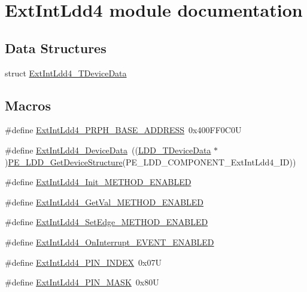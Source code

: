 \hypertarget{group___ext_int_ldd4__module}{\section{Ext\-Int\-Ldd4 module documentation}
\label{group___ext_int_ldd4__module}
}
\subsection*{Data Structures}
\begin{DoxyCompactItemize}
\item 
struct \hyperlink{struct_ext_int_ldd4___t_device_data}{Ext\-Int\-Ldd4\-\_\-\-T\-Device\-Data}
\end{DoxyCompactItemize}
\subsection*{Macros}
\begin{DoxyCompactItemize}
\item 
\#define \hyperlink{group___ext_int_ldd4__module_ga1693c80c3b1560249c672ecbb04484cc}{Ext\-Int\-Ldd4\-\_\-\-P\-R\-P\-H\-\_\-\-B\-A\-S\-E\-\_\-\-A\-D\-D\-R\-E\-S\-S}~0x400\-F\-F0\-C0\-U
\item 
\#define \hyperlink{group___ext_int_ldd4__module_ga8783b358df665e3568cd57ea48449719}{Ext\-Int\-Ldd4\-\_\-\-Device\-Data}~((\hyperlink{group___p_e___types__module_gac5cf1362f1f0e3a2ce71b1bf2276d091}{L\-D\-D\-\_\-\-T\-Device\-Data} $\ast$)\hyperlink{group___p_e___types__module_gaa1c23d559daef5bcd3327ca83fb56f5a}{P\-E\-\_\-\-L\-D\-D\-\_\-\-Get\-Device\-Structure}(P\-E\-\_\-\-L\-D\-D\-\_\-\-C\-O\-M\-P\-O\-N\-E\-N\-T\-\_\-\-Ext\-Int\-Ldd4\-\_\-\-I\-D))
\item 
\#define \hyperlink{group___ext_int_ldd4__module_ga5579cb8b94010961344a9ba2ca4fac53}{Ext\-Int\-Ldd4\-\_\-\-Init\-\_\-\-M\-E\-T\-H\-O\-D\-\_\-\-E\-N\-A\-B\-L\-E\-D}
\item 
\#define \hyperlink{group___ext_int_ldd4__module_gab23223167aa471dd8d7239d50b59fc39}{Ext\-Int\-Ldd4\-\_\-\-Get\-Val\-\_\-\-M\-E\-T\-H\-O\-D\-\_\-\-E\-N\-A\-B\-L\-E\-D}
\item 
\#define \hyperlink{group___ext_int_ldd4__module_ga3af526cfa02c613a416e8d5cea264c4b}{Ext\-Int\-Ldd4\-\_\-\-Set\-Edge\-\_\-\-M\-E\-T\-H\-O\-D\-\_\-\-E\-N\-A\-B\-L\-E\-D}
\item 
\#define \hyperlink{group___ext_int_ldd4__module_ga4035aa55e366680133095ea66d277a18}{Ext\-Int\-Ldd4\-\_\-\-On\-Interrupt\-\_\-\-E\-V\-E\-N\-T\-\_\-\-E\-N\-A\-B\-L\-E\-D}
\item 
\#define \hyperlink{group___ext_int_ldd4__module_ga461cbacc2c4729ebf39acb3439dfb10d}{Ext\-Int\-Ldd4\-\_\-\-P\-I\-N\-\_\-\-I\-N\-D\-E\-X}~0x07\-U
\item 
\#define \hyperlink{group___ext_int_ldd4__module_gac712c455525c29f44e0662f58f02006b}{Ext\-Int\-Ldd4\-\_\-\-P\-I\-N\-\_\-\-M\-A\-S\-K}~0x80\-U
\end{DoxyCompactItemize}
